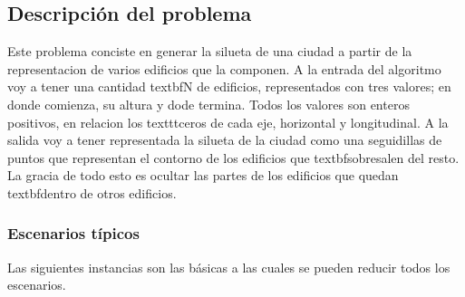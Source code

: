 \subsection{Descripci\'on del problema}

Este problema conciste en generar la silueta de una ciudad a partir de la representacion de varios edificios que la componen.
A la entrada del algoritmo voy a tener una cantidad textbf{N} de edificios, representados con tres valores; en donde comienza, su altura y dode termina. Todos los valores son enteros positivos, en relacion los texttt{ceros} de cada eje, horizontal y longitudinal.
A la salida voy a tener representada la silueta de la ciudad como una seguidillas de puntos que representan el contorno de los edificios que textbf{sobresalen} del resto.
La gracia de todo esto es ocultar las partes de los edificios que quedan textbf{dentro} de otros edificios.

\subsubsection*{Escenarios t\'ipicos}

Las siguientes instancias son las b\'asicas a las cuales se pueden reducir todos los escenarios.

